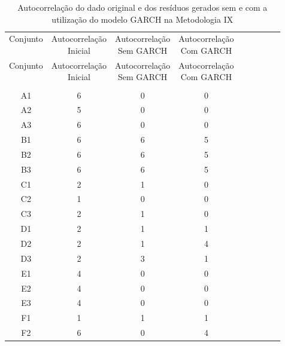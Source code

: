 \begin{center}
\begin{longtable}{ccccc|cccc}
\toprule
\rowcolor{white}
\caption[Metodologia IX: evolução da autocorrelação]{Autocorrelação do dado
original e dos resíduos gerados sem e com a utilização do modelo GARCH na
Metodologia IX} \label{tab:EvolucaoAutocorrelacaoMet9}\\
\midrule
Conjunto & \specialcell{Autocorrelação\\Inicial} & \specialcell{Autocorrelação\\Sem
GARCH} & \specialcell{Autocorrelação\\Com GARCH} \\
\midrule
\endfirsthead 
\midrule
\rowcolor{white}
Conjunto & \specialcell{Autocorrelação\\Inicial} & \specialcell{Autocorrelação\\Sem
GARCH} & \specialcell{Autocorrelação\\Com GARCH} \\
\toprule
\endhead
\midrule \\ %
\endfoot
\bottomrule 
\endlastfoot
    A1    & 6     & 0     & 0 \\
    A2    & 5     & 0     & 0 \\
    A3    & 6     & 0     & 0 \\
    B1    & 6     & 6     & 5 \\
    B2    & 6     & 6     & 5 \\
    B3    & 6     & 6     & 5 \\
    C1    & 2     & 1     & 0 \\
    C2    & 1     & 0     & 0 \\
    C3    & 2     & 1     & 0 \\
    D1    & 2     & 1     & 1 \\
    D2    & 2     & 1     & 4 \\
    D3    & 2     & 3     & 1 \\
    E1    & 4     & 0     & 0 \\
    E2    & 4     & 0     & 0 \\
    E3    & 4     & 0     & 0 \\
    F1    & 1     & 1     & 1 \\
    F2    & 6     & 0     & 4 \\

\end{longtable}
\end{center}
